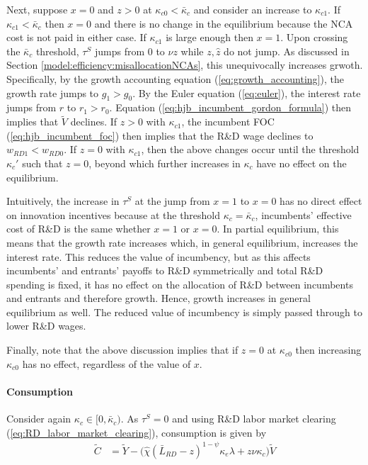 \documentclass[11pt,english]{article}
\begin{document}
Next, suppose $x = 0$ and $z > 0$ at $\kappa_{c0} < \bar{\kappa}_c$ and consider an increase to $\kappa_{c1}$. If $\kappa_{c1} < \bar{\kappa}_c$ then $x = 0$ and there is no change in the equilibrium because the NCA cost is not paid in either case. If $\kappa_{c1}$ is large enough then $x = 1$. Upon crossing the $\bar{\kappa}_c$ threshold, $\tau^S$ jumps from $0$ to $\nu z$ while $z,\hat{z}$ do not jump. As discussed in Section \ref{model:efficiency:misallocationNCAs}, this unequivocally increases grwoth. Specifically, by the growth accounting equation (\ref{eq:growth_accounting}), the growth rate jumps to $g_1 > g_0$. By the Euler equation (\ref{eq:euler}), the interest rate jumps from $r$ to $r_1>r_0$. Equation (\ref{eq:hjb_incumbent_gordon_formula}) then implies that $\tilde{V}$ declines. If $z > 0$ with $\kappa_{c1}$, the incumbent FOC (\ref{eq:hjb_incumbent_foc}) then implies that the R\&D wage declines to $w_{RD1} < w_{RD0}$. If $z = 0$ with $\kappa_{c1}$, then the above changes occur until the threshold $\kappa_{c}'$ such that $z = 0$, beyond which further increases in $\kappa_c$ have no effect on the equilibrium. 

Intuitively, the increase in $\tau^S$ at the jump from $x = 1$ to $x = 0$ has no direct effect on innovation incentives because at the threshold $\kappa_c = \bar{\kappa}_c$, incumbents' effective cost of R\&D is the same whether $x = 1$ or $x = 0$. In partial equilibrium, this means that the growth rate increases which, in general equilibrium, increases the interest rate. This reduces the value of incumbency, but as this affects incumbents' and entrants' payoffs to R\&D symmetrically and total R\&D spending is fixed, it has no effect on the allocation of R\&D between incumbents and entrants and therefore growth. Hence, growth increases in general equilibrium as well. The reduced value of incumbency is simply passed through to lower R\&D wages.

Finally, note that the above discussion implies that if $z = 0$ at $\kappa_{c0}$ then increasing $\kappa_{c0}$ has no effect, regardless of the value of $x$. 

\paragraph{Consumption}\label{cs:consumption1}

Consider again $\kappa_c \in [0, \bar{\kappa}_c)$. As $\tau^S = 0$ and using R\&D labor market clearing (\ref{eq:RD_labor_market_clearing}), consumption is given by 
\begin{align}
\tilde{C} &= \tilde{Y} - \Big( \hat{\chi} (\bar{L}_{RD} - z)^{1-\psi} \kappa_e \lambda + z \nu \kappa_c \Big) \tilde{V} \label{cs:consumption_eq}
\end{align}
\end{document}
